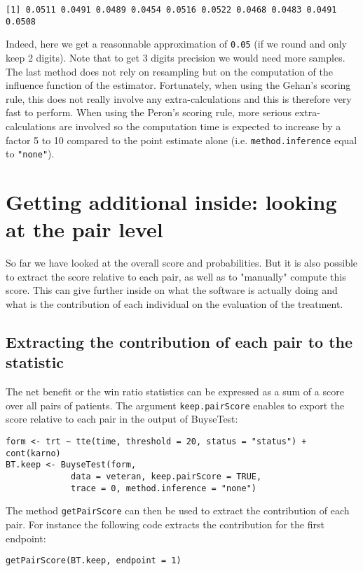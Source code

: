 \documentclass[12pt]{article}
\begin{document}
\begin{verbatim}
[1] 0.0511 0.0491 0.0489 0.0454 0.0516 0.0522 0.0468 0.0483 0.0491 0.0508
\end{verbatim}
Indeed, here we get a reasonnable approximation of \texttt{0.05} (if we round
and only keep 2 digits). Note that to get 3 digits precision we would
need more samples. The last method does not rely on resampling but on
the computation of the influence function of the
estimator. Fortunately, when using the Gehan's scoring rule, this does
not really involve any extra-calculations and this is therefore very
fast to perform. When using the Peron's scoring rule, more serious
extra-calculations are involved so the computation time is expected to
increase by a factor 5 to 10 compared to the point estimate alone
(i.e. \texttt{method.inference} equal to \texttt{"none"}).

\clearpage

\section{Getting additional inside: looking at the pair level}
\label{sec:org84c178e}

So far we have looked at the overall score and probabilities. But it
is also possible to extract the score relative to each pair, as well
as to "manually" compute this score. This can give further inside on
what the software is actually doing and what is the contribution of
each individual on the evaluation of the treatment.

\subsection{Extracting the contribution of each pair to the statistic}
\label{sec:org7667d9c}
The net benefit or the win ratio statistics can be expressed as a sum
of a score over all pairs of patients. The argument \texttt{keep.pairScore}
enables to export the score relative to each pair in the output of
BuyseTest:
\lstset{language=r,label= ,caption= ,captionpos=b,numbers=none}
\begin{lstlisting}
form <- trt ~ tte(time, threshold = 20, status = "status") + cont(karno)
BT.keep <- BuyseTest(form,
		     data = veteran, keep.pairScore = TRUE, 
		     trace = 0, method.inference = "none")
\end{lstlisting}

The method \texttt{getPairScore} can then be used to extract the contribution
of each pair. For instance the following code extracts the
contribution for the first endpoint:
\lstset{language=r,label= ,caption= ,captionpos=b,numbers=none}
\begin{lstlisting}
getPairScore(BT.keep, endpoint = 1)
\end{lstlisting}
\end{document}
